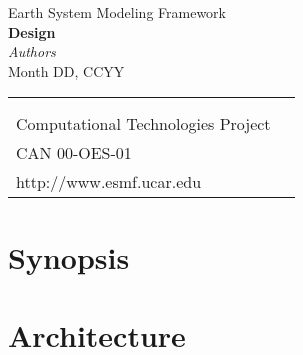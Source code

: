 \documentclass[]{article}
\begin{document}

\begin{titlepage}

\begin{center}
{\Large Earth System Modeling Framework } \\
\vspace{.25in}
{\Large {\bf <Module, Library, Component or Model Name> Design}} \\
\vspace{.25in}
{\large {\it Authors}} \\
\vspace{.25in}
{Month DD, CCYY}
\vspace{.5in}
\end{center}

\begin{latexonly}
\vspace{5.5in}
\begin{tabular}{p{5in}p{.9in}}
\hrulefill \\
\noindent {\bf NASA Earth Science Technology Office} \\
\noindent Computational Technologies Project \\
\noindent CAN 00-OES-01 \\
\noindent http://www.esmf.ucar.edu \\
\end{tabular}
\end{latexonly}

\end{titlepage}

\tableofcontents

\newpage
\section{Synopsis}


%

%

\section{Architecture}

\end{document}
